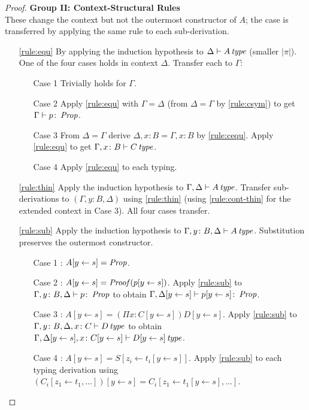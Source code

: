\begin{proof}
    \noindent
    \textbf{Group II: Context-Structural Rules} \\
    These change the context but not the outermost constructor of $A$; the case is transferred by applying the same rule to each sub-derivation.
    \begin{enumerate}
        \item[\ref{rule:equ}]
        By applying the induction hypothesis to $\Delta \vdash A \operatorname{\mathit{\space type}}$ (smaller $|\pi|$). One of the four cases holds in context $\Delta$. Transfer each to $\Gamma$:
        \begin{itemize}
            \item[Case 1]  Trivially holds for $\Gamma$.
            \item[Case 2]  Apply \ref{rule:equ} with $\Gamma = \Delta$ (from $\Delta = \Gamma$ by \ref{rule:csym}) to get $\Gamma \vdash p \colon \operatorname{\mathit{Prop}}$.
            \item[Case 3]  From $\Delta = \Gamma$ derive $\Delta, x \colon B = \Gamma, x \colon B$ by \ref{rule:cequ}. Apply \ref{rule:equ} to get $\Gamma, x \colon B \vdash C \operatorname{\mathit{\space type}}$.
            \item[Case 4]  Apply \ref{rule:equ} to each typing.
        \end{itemize}
        
        \item[\ref{rule:thin}]
        Apply the induction hypothesis to $\Gamma,\Delta \vdash A \operatorname{\mathit{\space type}}$. Transfer sub-derivations to $(\Gamma, y\colon B, \Delta)$ using \ref{rule:thin} (using \ref{rule:cont-thin} for the extended context in Case 3). All four cases transfer.
        
        \item[\ref{rule:sub}]
        Apply the induction hypothesis to $\Gamma, y \colon B, \Delta \vdash A \operatorname{\mathit{\space type}}$. Substitution preserves the outermost constructor.
        \begin{itemize}
            \item[Case 1]: $A[y \leftarrow s] = \operatorname{\mathit{Prop}}$.
            \item[Case 2]: $A[y\leftarrow s] = \operatorname{\mathit{Proof}}(p[y\leftarrow s])$. Apply \ref{rule:sub} to $\Gamma,y \colon B,\Delta \vdash p\colon\operatorname{\mathit{Prop}}$ to obtain $\Gamma,\Delta[y\leftarrow s] \vdash p[y\leftarrow s] \colon \operatorname{\mathit{Prop}}$.
            \item[Case 3]: $A[y\leftarrow s] = (\Pi x \colon C[y\leftarrow s])D[y\leftarrow s]$. Apply \ref{rule:sub} to $\Gamma,y \colon B,\Delta,x \colon C \vdash D \operatorname{\mathit{\space type}}$ to obtain $\Gamma,\Delta[y\leftarrow s],x \colon C[y\leftarrow s] \vdash D[y\leftarrow s] \operatorname{\mathit{\space type}}$.
            \item[Case 4]: $A[y\leftarrow s] = S[z_i \leftarrow t_i[y\leftarrow s]]$. Apply \ref{rule:sub} to each typing derivation using $(C_i[z_1\leftarrow t_1,\ldots])[y\leftarrow s] = C_i[z_1 \leftarrow t_1[y\leftarrow s],\ldots]$.
        \end{itemize}
    \end{enumerate}


\end{proof}
